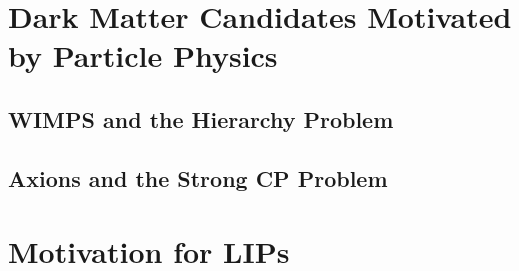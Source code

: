 \section{Dark Matter Candidates Motivated by Particle Physics}
\subsection{WIMPS and the Hierarchy Problem}
\subsection{Axions and the Strong CP Problem}

\section{Motivation for LIPs}
